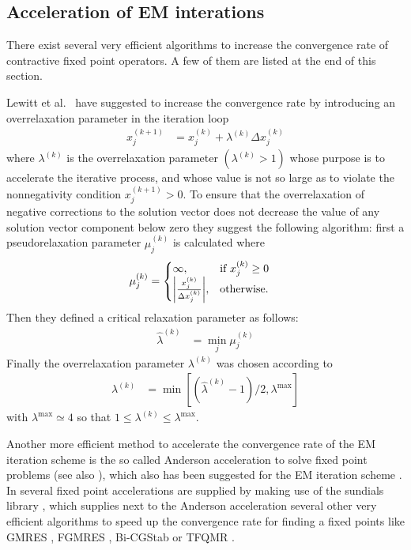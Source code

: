 \clearpage
\subsection{Acceleration of EM interations}

There exist several very efficient algorithms to increase the convergence rate of contractive fixed point operators. A few of them are listed at the end of this section.

 Lewitt et al.\ \cite{Lewitt1986} have suggested to increase the convergence rate by introducing an overrelaxation parameter in the iteration loop
\begin{align}\label{eq:OverRelaxation}
  x_j^{(k+1)} &= x_j^{(k)} + \lambda^{(k)}\Delta x_j^{(k)}
\end{align}
where $\lambda^{(k)}$ is the overrelaxation parameter $(\lambda^{(k)}> 1)$ whose
purpose is to accelerate the iterative process, and whose value is not so large as to violate the nonnegativity condition $x_j^{(k+1)} > 0$. To ensure that the overrelaxation of negative corrections to the solution vector does not decrease the value of any solution vector component below zero they suggest the following algorithm: first a pseudorelaxation parameter $\mu_j^{(k)}$ is calculated where
\begin{align}
\label{eq:pseudorelaxation}
  \mu_j^{(k)} &=
  \begin{cases}
    \infty, & \mbox{if } x_j^{(k)} \geq 0 \\
    \abs{\frac{x_j^{(k)}}{\Delta x_j^{(k)}}}, & \mbox{otherwise}.
  \end{cases}
\end{align}
Then they defined a critical relaxation parameter as follows:
\begin{align}\label{eq:criticalrelaxationparameter}
  \hat{\lambda}^{(k)} &= \min_j \mu_j^{(k)}
\end{align}
Finally the overrelaxation parameter $\lambda^{(k)}$ was chosen according to
\begin{align}\label{eq:useopverrelaxationparameter}
  \lambda^{(k)} &= \min \left[ \left(\hat{\lambda}^{(k)}-1\right)/2,\lambda^{\max}\right]
\end{align}
with $\lambda^{\max} \simeq 4$ so that $1\leq  \lambda^{(k)}\leq \lambda^{\max}$.

Another more efficient method to accelerate the convergence rate of the EM iteration scheme is the so called Anderson acceleration \cite{Anderson1965} to solve fixed point problems (see also \cite{Walker2011,Toth2015}), which also has been suggested for the EM iteration scheme \cite{Henderson2019}. In \SASfit several fixed point accelerations are supplied by making use of the sundials library \cite{Hindmarsh2005}, which supplies next to the Anderson acceleration several other very efficient algorithms to speed up the convergence rate for finding a fixed points like GMRES \cite{Saad1986}, FGMRES \cite{Saad1993}, Bi-CGStab \cite{Vorst1992} or TFQMR \cite{Freund1993}.

